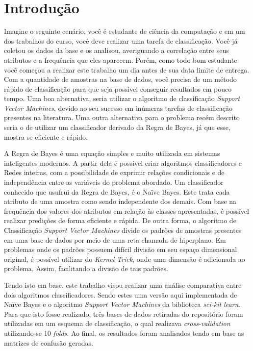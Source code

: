 \documentclass[12pt]{article}
\begin{document}
\section{Introdução}
    Imagine o seguinte cenário, você é estudante de ciência da computação e em um dos trabalhos do curso, você deve realizar uma tarefa de classificação. Você já coletou os dados da base e os analisou, averiguando a correlação entre seus atributos e a frequência que eles aparecem. Porém, como todo bom estudante você começou a realizar este trabalho um dia antes de sua data limite de entrega. Com a quantidade de amostras na base de dados, você precisa de um método rápido de classificação para que seja possível conseguir resultados em pouco tempo. Uma boa alternativa, seria utilizar o algoritmo de classificação \textit{Support Vector Machines}, devido ao seu sucesso em inúmeras tarefas de classificação presentes na literatura. Uma outra alternativa para o problema recém descrito seria o de utilizar um classificador derivado da Regra de Bayes, já que esse, mostra-se eficiente e rápido.
    
    A Regra de Bayes é uma equação simples e muito utilizada em sistemas inteligentes modernos. A partir dela é possível criar algoritmos classificadores e Redes inteiras, com a possibilidade de exprimir relações condicionais e de independência entre as variáveis do problema abordado. Um classificador conhecido que usufrui da Regra de Bayes, é o Naïve Bayes. Este trata cada atributo de uma amostra como sendo independente dos demais. Com base na frequência dos valores dos atributos em relação às classes apresentadas, é possível realizar predições de forma eficiente e rápida. De outra forma, o algoritmo de Classificação \textit{Support Vector Machines} divide os padrões de amostras presentes em uma base de dados por meio de uma reta chamada de hiperplano. Em problemas onde os padrões possuem difícil divisão em seu espaço dimensional original, é possível utilizar do \textit{Kernel Trick}, onde uma dimensão é adicionada ao problema. Assim, facilitando a divisão de tais padrões.
    
    Tendo isto em base, este trabalho visou realizar uma análise comparativa entre dois algoritmos classificadores. Sendo estes uma versão aqui implementada de Naïve Bayes e o algoritmo \textit{Support Vector Machines} da biblioteca \textit{sci-kit learn}. Para que isto fosse realizado, três bases de dados retiradas do repositório \cite{Dua:2017} foram utilizadas em um esquema de classificação, o qual realizava \textit{cross-validation} utilizando-se 10 \textit{folds}. Ao final, os resultados foram analisados tendo em base as matrizes de confusão geradas.
    
\end{document}
